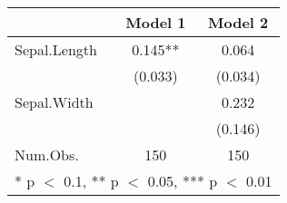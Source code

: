 \begin{table}
\centering
\begin{tabular}[t]{lcc}
\toprule
  & Model 1 & Model 2\\
\midrule
Sepal.Length & 0.145** & 0.064\\
 & (0.033) & (0.034)\\
Sepal.Width &  & 0.232\\
 &  & (0.146)\\
\midrule
Num.Obs. & 150 & 150\\
\bottomrule
\multicolumn{3}{l}{\rule{0pt}{1em}* p $<$ 0.1, ** p $<$ 0.05, *** p $<$ 0.01}\\
\end{tabular}
\end{table}
